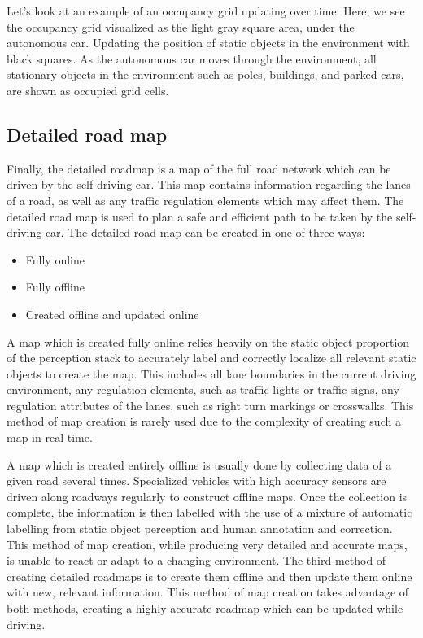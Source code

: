 Let's look at an example of
an occupancy grid updating over time. Here, we see the occupancy grid
visualized as the light gray square area, under the autonomous car. Updating the position of static objects
in the environment with black squares. As the autonomous car moves
through the environment, all stationary objects in the environment
such as poles, buildings, and parked cars,
are shown as occupied grid cells. 


\subsection{Detailed road map}

Finally, the detailed roadmap is
a map of the full road network which can be driven by
the self-driving car. This map contains information
regarding the lanes of a road, as well as any traffic regulation
elements which may affect them. The detailed road map is
used to plan a safe and efficient path to be taken
by the self-driving car. The detailed road map can be
created in one of three ways:

\begin{itemize}
\item Fully online
\item Fully offline
\item Created offline and updated online
\end{itemize}

A map which is created fully online relies
heavily on the static object proportion of the perception stack
to accurately label and correctly localize all relevant
static objects to create the map. This includes all lane boundaries
in the current driving environment, any regulation elements,
such as traffic lights or traffic signs, any regulation attributes of the lanes,
such as right turn markings or crosswalks. This method of map creation is rarely used due to the complexity of
creating such a map in real time. 

A map which is created entirely offline
is usually done by collecting data of a given road several times. Specialized vehicles with high accuracy
sensors are driven along roadways regularly to construct offline maps. Once the collection is complete, the
information is then labelled with the use of a mixture of automatic labelling
from static object perception and human annotation and correction. This method of map creation,
while producing very detailed and accurate maps, is unable to react or
adapt to a changing environment. The third method of creating detailed
roadmaps is to create them offline and then update them online with new,
relevant information. This method of map creation
takes advantage of both methods, creating a highly accurate roadmap
which can be updated while driving. 

